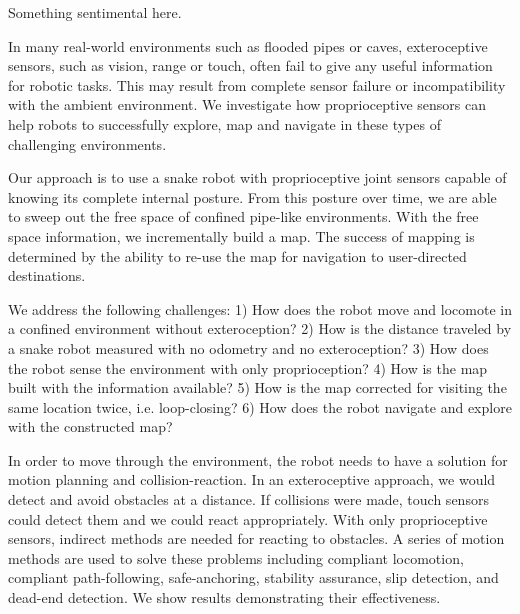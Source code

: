 
\def\mytitle{Exploring and Mapping Confined and Sensor-Challenged Environments with Proprioception of an Articulated Mobile Robot}
\def\myauthor{Jacob Everist}
\def\bibliocommand{}




Something sentimental here.




In many real-world environments such as flooded pipes or caves, exteroceptive sensors, such as vision, range or touch, often fail to give any useful information for robotic tasks. This may result from complete sensor failure or incompatibility with the ambient environment. We investigate how proprioceptive sensors can help robots to successfully explore, map and navigate in these types of challenging environments.

Our approach is to use a snake robot with proprioceptive joint sensors capable of knowing its complete internal posture. From this posture over time, we are able to sweep out the free space of confined pipe-like environments. With the free space information, we incrementally build a map. The success of mapping is determined by the ability to re-use the map for navigation to user-directed destinations.

We address the following challenges: 1) How does the robot move and locomote in a confined environment without exteroception? 2) How is the distance traveled by a snake robot measured with no odometry and no exteroception? 3) How does the robot sense the environment with only proprioception? 4) How is the map built with the information available? 5) How is the map corrected for visiting the same location twice, i.e. loop-closing? 6) How does the robot navigate and explore with the constructed map?

In order to move through the environment, the robot needs to have a solution for motion planning and collision-reaction. In an exteroceptive approach, we would detect and avoid obstacles at a distance. If collisions were made, touch sensors could detect them and we could react appropriately. With only proprioceptive sensors, indirect methods are needed for reacting to obstacles. A series of motion methods are used to solve these problems including compliant locomotion, compliant path-following, safe-anchoring, stability assurance, slip detection, and dead-end detection. We show results demonstrating their effectiveness.


